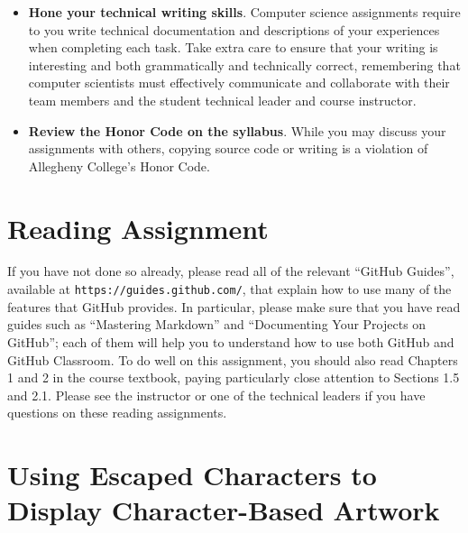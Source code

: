 \documentclass[11pt]{article}
\newcommand{\url}[1]{\lstinline{#1}}
\begin{document}
\begin{itemize}
\item {\bf Hone your technical writing skills}. Computer science assignments
  require to you write technical documentation and descriptions of your
  experiences when completing each task. Take extra care to ensure that your
  writing is interesting and both grammatically and technically correct,
  remembering that computer scientists must effectively communicate and
  collaborate with their team members and the student technical leader and
  course instructor.

\item {\bf Review the Honor Code on the syllabus}. While you may discuss your
  assignments with others, copying source code or writing is a violation of
  Allegheny College's Honor Code.

\end{itemize}

\section*{Reading Assignment}

If you have not done so already, please read all of the relevant ``GitHub
Guides'', available at \url{https://guides.github.com/}, that explain how to
use many of the features that GitHub provides. In particular, please make sure
that you have read guides such as ``Mastering Markdown'' and ``Documenting Your
Projects on GitHub''; each of them will help you to understand how to use both
GitHub and GitHub Classroom. To do well on this assignment, you should also
read Chapters 1 and 2 in the course textbook, paying particularly close
attention to Sections 1.5 and 2.1. Please see the instructor or one of the
technical leaders if you have questions on these reading assignments.

\section*{Using Escaped Characters to Display Character-Based Artwork}
\end{document}

